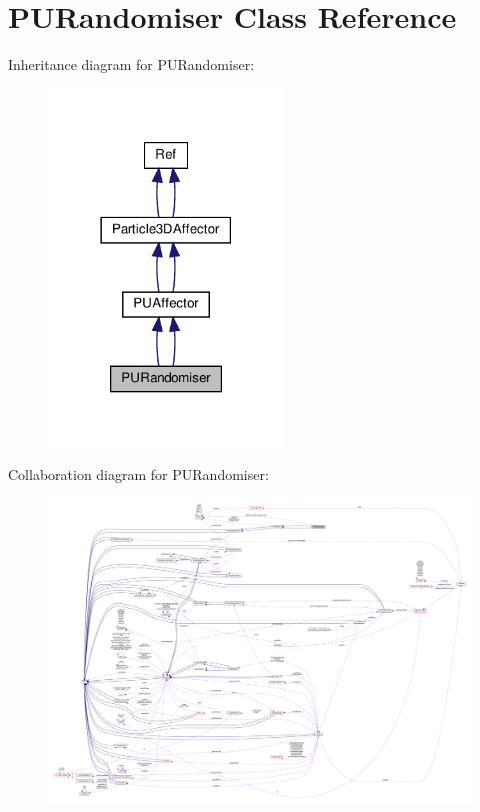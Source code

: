 \hypertarget{classPURandomiser}{}\section{P\+U\+Randomiser Class Reference}
\label{classPURandomiser}


Inheritance diagram for P\+U\+Randomiser\+:
\nopagebreak
\begin{figure}[H]
\begin{center}
\leavevmode
\includegraphics[width=177pt]{classPURandomiser__inherit__graph}
\end{center}
\end{figure}


Collaboration diagram for P\+U\+Randomiser\+:
\nopagebreak
\begin{figure}[H]
\begin{center}
\leavevmode
\includegraphics[width=350pt]{classPURandomiser__coll__graph}
\end{center}
\end{figure}
